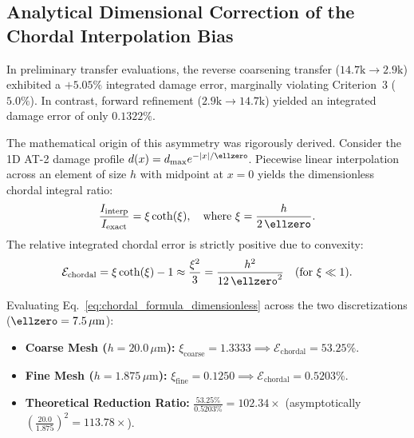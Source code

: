 \begin{enumerate}
\begin{center}
\end{center}

\subsection{Analytical Dimensional Correction of the Chordal Interpolation Bias}
\label{subsec:method_c_chordal_bias_correction}

In preliminary transfer evaluations, the reverse coarsening transfer ($14.7\mathrm{k} \to 2.9\mathrm{k}$) exhibited a $+5.05\%$ integrated damage error, marginally violating Criterion~3 ($5.0\%$). In contrast, forward refinement ($2.9\mathrm{k} \to 14.7\mathrm{k}$) yielded an integrated damage error of only $0.1322\%$.

The mathematical origin of this asymmetry was rigorously derived. Consider the 1D AT-2 damage profile $d(x) = d_{\max} e^{-|x|/\ellzero}$. Piecewise linear interpolation across an element of size $h$ with midpoint at $x=0$ yields the dimensionless chordal integral ratio:
\begin{equation}
  \frac{I_{\mathrm{interp}}}{I_{\mathrm{exact}}} = \xi \coth(\xi), \quad \text{where } \xi = \frac{h}{2\,\ellzero}.
  \label{eq:chordal_formula_dimensionless}
\end{equation}
The relative integrated chordal error is strictly positive due to convexity:
\begin{equation}
  \mathcal{E}_{\mathrm{chordal}} = \xi \coth(\xi) - 1 \approx \frac{\xi^2}{3} = \frac{h^2}{12\,\ellzero^2} \quad (\text{for } \xi \ll 1).
  \label{eq:chordal_taylor_expansion}
\end{equation}

Evaluating Eq.~\eqref{eq:chordal_formula_dimensionless} across the two discretizations ($\ellzero = 7.5\,\mu\mathrm{m}$):
\begin{itemize}
  \item \textbf{Coarse Mesh ($h = 20.0\,\mu\mathrm{m}$):} $\xi_{\mathrm{coarse}} = 1.3333 \implies \mathcal{E}_{\mathrm{chordal}} = 53.25\%$.
  \item \textbf{Fine Mesh ($h = 1.875\,\mu\mathrm{m}$):} $\xi_{\mathrm{fine}} = 0.1250 \implies \mathcal{E}_{\mathrm{chordal}} = 0.5203\%$.
  \item \textbf{Theoretical Reduction Ratio:} $\frac{53.25\%}{0.5203\%} = 102.34\times$ (asymptotically $\left(\frac{20.0}{1.875}\right)^2 = 113.78\times$).
\end{itemize}


\end{enumerate}
